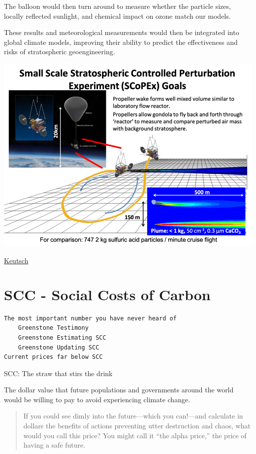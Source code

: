 \documentclass[
]{book}
\begin{document}
The balloon would then turn around to measure whether the particle sizes, locally reflected sunlight, and chemical impact on ozone match our models.

These results and meteorological measurements would then be integrated into global climate models, improving their ability to predict the effectiveness and risks of stratospheric geoengineering.

\includegraphics{fig/Scopex-Picture.png}

\href{https://www.c2g2.net/stratospheric-aerosol-injection-could-be-a-painkiller-but-not-a-cure-and-more-research-is-needed/}{Keutsch}

\hypertarget{scc---social-costs-of-carbon}{%
\chapter{SCC - Social Costs of Carbon}\label{scc---social-costs-of-carbon}}

\begin{verbatim}
The most important number you have never heard of
    Greenstone Testimony
    Greenstone Estimating SCC
    Greenstone Updating SCC     
Current prices far below SCC
\end{verbatim}

SCC: The straw that stirs the drink

The dollar value that future populations and governments around the
world would be willing to pay to avoid experiencing climate change.

\begin{quote}
If you could see dimly into the future---which you can!---and calculate in dollars the benefits of actions preventing utter destruction and chaos, what would you call this price?
You might call it ``the alpha price,'' the price of having a safe future.
\end{quote}
\end{document}
